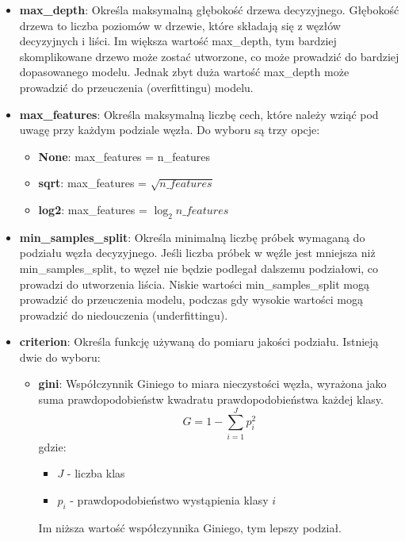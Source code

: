 \documentclass{article}
\begin{document}
\begin{itemize}
    \item \textbf{max\_depth}: Określa maksymalną 
    głębokość drzewa decyzyjnego. 
    Głębokość drzewa to liczba poziomów w 
    drzewie, które składają się z węzłów 
    decyzyjnych i liści. Im większa wartość 
    max\_depth, tym bardziej skomplikowane 
    drzewo może zostać utworzone, co może 
    prowadzić do bardziej dopasowanego modelu. 
    Jednak zbyt duża wartość max\_depth może 
    prowadzić do przeuczenia (overfittingu) modelu.
    \item \textbf{max\_features}: Określa maksymalną
    liczbę cech, które należy wziąć pod uwagę
    przy każdym podziale węzła. Do wyboru są trzy opcje:
    \begin{itemize}
        \item \textbf{None}: max\_features = n\_features
        \item \textbf{sqrt}: max\_features = $\sqrt{n\_features}$
        \item \textbf{log2}: max\_features = $\log_2{n\_features}$
    \end{itemize}
    \item \textbf{min\_samples\_split}: Określa minimalną 
    liczbę próbek wymaganą do podziału węzła decyzyjnego. 
    Jeśli liczba próbek w węźle jest mniejsza niż 
    min\_samples\_split, to węzeł nie będzie podlegał 
    dalszemu podziałowi, co prowadzi do utworzenia 
    liścia. Niskie wartości min\_samples\_split mogą 
    prowadzić do przeuczenia modelu, podczas gdy 
    wysokie wartości mogą prowadzić do niedouczenia (underfittingu).
    \item \textbf{criterion}: Określa funkcję używaną 
    do pomiaru jakości podziału. Istnieją dwie do wyboru:
    \begin{itemize}
        \item \textbf{gini}: Współczynnik Giniego to miara
        nieczystości węzła, wyrażona jako suma prawdopodobieństw
        kwadratu prawdopodobieństwa każdej klasy.
        \begin{equation}
            G = 1 - \sum_{i=1}^{J}p_i^2
        \end{equation}
        gdzie: 
        \begin{itemize}
            \item $J$ - liczba klas
            \item $p_i$ - prawdopodobieństwo wystąpienia klasy $i$
        \end{itemize}
        Im niższa wartość współczynnika Giniego, tym lepszy podział.

\end{itemize}
\end{itemize}
\end{document}
